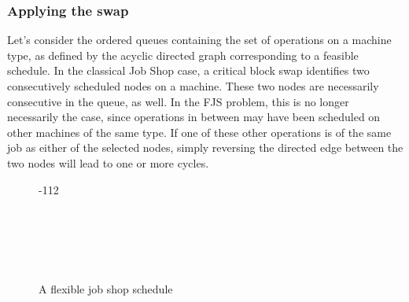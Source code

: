 \documentclass[a4paper,10pt]{article}
\begin{document}
\subsubsection{Applying the swap}

Let's consider the ordered queues containing the set of operations on a machine type, as defined by the acyclic directed graph corresponding to a feasible schedule. In the classical Job Shop case, a critical block swap identifies two consecutively scheduled nodes on a machine. These two nodes are necessarily consecutive in the queue, as well. In the FJS problem, this is no longer necessarily the case, since operations in between may have been scheduled on other machines of the same type. If one of these other operations is of the same job as either of the selected nodes, simply reversing the directed edge between the two nodes will lead to one or more cycles.

\begin{figure}[h]
\centering
\begin{ganttchart}[
		x unit=0.7cm,
		y unit chart=0.7cm,
		canvas/.style={draw=none,fill=none},
		vgrid,
		vgrid={*1{draw=black!12}},
		inline,
		group/.style={draw=none,fill=none},
		bar top shift=0.1,
		bar height=0.8,
		y unit title=0.5cm,
		title/.style={draw=none,fill=none},
		include title in canvas=false,
	]{-1}{12}

	 \\

	 \\

	 \\

	 \\
	

\end{ganttchart}
\caption{A flexible job shop schedule}
\label{fig:sch-swap}
\end{figure}
\end{document}
